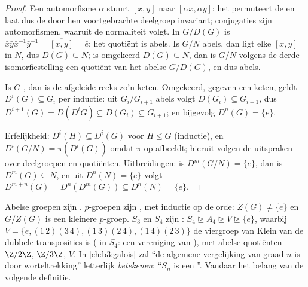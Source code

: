 \begin{proof}
Een automorfisme $\alpha$ stuurt $[x,y]$ naar $[\alpha x, \alpha
y]$: het permuteert de  en laat dus de door hen
voortgebrachte deelgroep invariant; conjugaties zijn
automorfismen, waaruit de normaliteit volgt. In $G/D(G)$ is $\bar
x\bar y \bar x^{-1}\bar y^{-1} = \overline{[x,y]} = \bar e$: het
quotiënt is abels. Is $G/N$ abels, dan ligt elke $[x,y]$ in $N$,
dus $D(G) \subseteq N$; is omgekeerd $D(G) \subseteq N$, dan is
$G/N$ volgens de derde isomorfiestelling een quotiënt van het
abelse $G/D(G)$, en dus abels.

Is $G$ , dan is de afgeleide reeks zo'n keten. Omgekeerd,
gegeven een keten, geldt $D^i(G) \subseteq G_i$ per inductie: uit
$G_i/G_{i+1}$ abels volgt $D(G_i) \subseteq G_{i+1}$, dus
$D^{i+1}(G) = D(D^i G) \subseteq D(G_i) \subseteq G_{i+1}$; en
bijgevolg $D^n(G) = \{e\}$.

Erfelijkheid: $D^i(H) \subseteq D^i(G)$ voor $H \leq G$ (inductie),
en $D^i(G/N) = \pi(D^i(G))$ omdat $\pi$  op
 afbeeldt; hieruit volgen de uitspraken over
deelgroepen en quotiënten. Uitbreidingen: is $D^m(G/N) = \{e\}$,
dan is $D^m(G) \subseteq N$, en uit $D^n(N) = \{e\}$ volgt
$D^{m+n}(G) = D^n(D^m(G)) \subseteq D^n(N) = \{e\}$.
\end{proof}

\begin{example}\label{ex:b3:groups:solvableexamples}
Abelse groepen zijn . $p$-groepen zijn , met
inductie op de orde: $Z(G) \neq \{e\}$ en $G/Z(G)$ is een kleinere
$p$-groep. $S_3$ en $S_4$ zijn : $S_4 \trianglerighteq A_4
\trianglerighteq V \trianglerighteq \{e\}$, waarbij $V = \{e,
(1\,2)(3\,4), (1\,3)(2\,4), (1\,4)(2\,3)\}$ de viergroep van Klein
van de dubbele transposities is ( in $S_4$: een vereniging
van ), met abelse quotiënten $\Z/2\Z$, $\Z/3\Z$,
$V$. In \cref{ch:b3:galois} zal ``de algemene vergelijking van
graad $n$ is  door worteltrekking'' letterlijk
\emph{betekenen}: ``$S_n$ is een ''. Vandaar het
belang van de volgende definitie.
\end{example}

